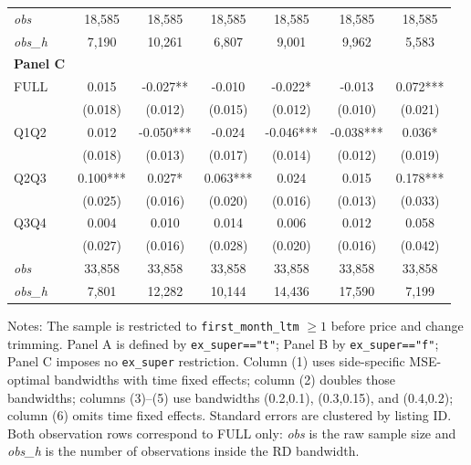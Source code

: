 \begin{table}[!htbp]
\begin{tabular}{lcccccc}
\textit{obs} & 18,585 & 18,585 & 18,585 & 18,585 & 18,585 & 18,585 \\
\textit{obs\_h} &  7,190 & 10,261 &  6,807 &  9,001 &  9,962 &  5,583 \\

\textbf{Panel C} &&&&&&  \\

FULL & 0.015 & -0.027** & -0.010 & -0.022* & -0.013 & 0.072*** \\
 & (0.018) & (0.012) & (0.015) & (0.012) & (0.010) & (0.021) \\
Q1Q2 & 0.012 & -0.050*** & -0.024 & -0.046*** & -0.038*** & 0.036* \\
 & (0.018) & (0.013) & (0.017) & (0.014) & (0.012) & (0.019) \\
Q2Q3 & 0.100*** & 0.027* & 0.063*** & 0.024 & 0.015 & 0.178*** \\
 & (0.025) & (0.016) & (0.020) & (0.016) & (0.013) & (0.033) \\
Q3Q4 & 0.004 & 0.010 & 0.014 & 0.006 & 0.012 & 0.058 \\
 & (0.027) & (0.016) & (0.028) & (0.020) & (0.016) & (0.042) \\

\textit{obs} & 33,858 & 33,858 & 33,858 & 33,858 & 33,858 & 33,858 \\
\textit{obs\_h} &  7,801 & 12,282 & 10,144 & 14,436 & 17,590 &  7,199 \\

\bottomrule
\end{tabular}
\begin{minipage}{0.98\textwidth}\footnotesize
Notes: The sample is restricted to \texttt{first\_month\_ltm} $\geq 1$ before price and change trimming. Panel A is defined by \texttt{ex\_super=="t"}; Panel B by \texttt{ex\_super=="f"}; Panel C imposes no \texttt{ex\_super} restriction. Column (1) uses side-specific MSE-optimal bandwidths with time fixed effects; column (2) doubles those bandwidths; columns (3)--(5) use bandwidths (0.2,0.1), (0.3,0.15), and (0.4,0.2); column (6) omits time fixed effects. Standard errors are clustered by listing ID. Both observation rows correspond to FULL only: \textit{obs} is the raw sample size and \textit{obs\_h} is the number of observations inside the RD bandwidth.
\end{minipage}
\end{table}
\clearpage

